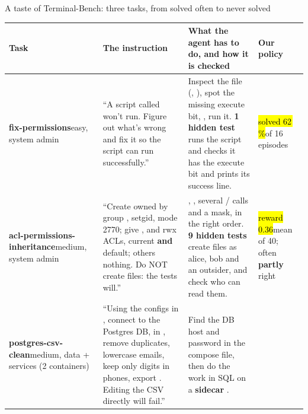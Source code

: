 \begin{frame}{A taste of Terminal-Bench: three tasks, from solved often to never solved}
\tiny\setlength{\tabcolsep}{3pt}
\begin{tabularx}{\textwidth}{@{}P{0.16\textwidth} P{0.33\textwidth} Y P{0.17\textwidth}@{}}
\toprule
\textbf{Task} & \textbf{The instruction} & \textbf{What the agent has to do, and how it is checked} & \textbf{Our policy}\\
\midrule
\textbf{fix-permissions}\newline\textcolor{inkmuted}{easy, system admin}\newline\smv{} &
``A script called  won't run. Figure out what's wrong and fix it so the script can run successfully.'' &
Inspect the file (, ), spot the missing execute bit, , run it.\newline
\textbf{1 hidden test} runs the script and checks it has the execute bit and prints its success line. &
\hl{solved 62\,\%}\newline of 16 episodes\\[1.4mm]
\textbf{acl-permissions-inheritance}\newline\textcolor{inkmuted}{medium, system admin}\newline\smv{} &
``Create  owned by group , setgid, mode 2770; give ,  and  rwx
ACLs, current \textbf{and} default; others nothing. Do NOT create files: the tests will.'' &
, , several  /  calls and a mask, in the right order.\newline
\textbf{9 hidden tests} create files as alice, bob and an outsider, and check who can read them. &
\hl{reward 0.36}\newline mean of 40; often \textbf{partly} right\\[1.4mm]
\textbf{postgres-csv-clean}\newline\textcolor{inkmuted}{medium, data + services}\newline\sm{} (2 containers) &
``Using the configs in , connect to the Postgres DB,  in ,
remove duplicates, lowercase emails, keep only digits in phones, export . Editing the CSV
directly will fail.'' &
Find the DB host and password in the compose file, then do the work in SQL on a \textbf{sidecar} .\newline

\end{tabularx}
\end{frame}
